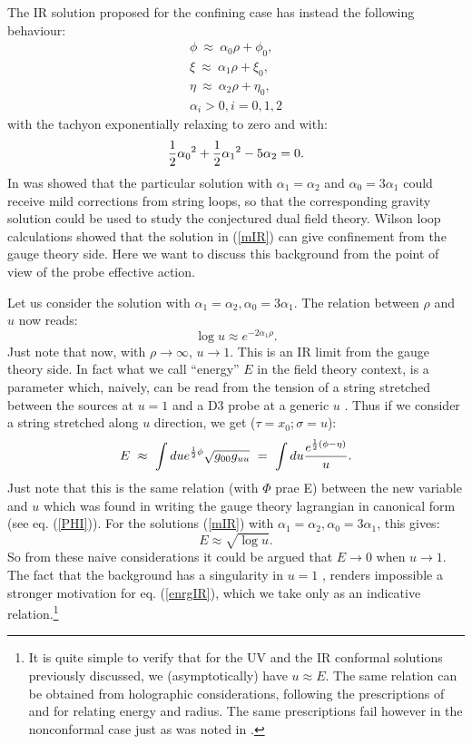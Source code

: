 \documentclass[a4paper,12pt]{article}
\def\half{{1 \over 2}}
\begin{document}
The IR solution proposed for the confining case \cite{minahan} has instead the following behaviour:
\begin{eqnarray}
\phi~\approx~ \alpha_0\rho + \phi_0 ,\nonumber\\
\xi~\approx~ \alpha_1\rho + \xi_0 ,\nonumber \\
\eta~\approx~ \alpha_2\rho +\eta_0,\nonumber \\
\alpha_i>0, i=0,1,2
\label{mIR}
\end{eqnarray}
with the tachyon exponentially relaxing to zero and with:
\begin{equation}
\half{\alpha_0}^2 + \half{\alpha_1}^2 -5{\alpha_2} = 0.
\end{equation}
In \cite{minahan} was showed that the particular solution with $\alpha_1=\alpha_2$ 
and $\alpha_0 = 3\alpha_1$ could receive mild corrections from
string loops, so that the corresponding gravity solution could be used to study the
conjectured dual field theory. Wilson loop calculations showed that the solution in 
(\ref{mIR}) can give confinement from the gauge theory side. Here we want to discuss
this background from the point of view of the probe effective action.

Let us consider the solution with $\alpha_1=\alpha_2 , \alpha_0 =3\alpha_1$. The 
relation between  $\rho$ and $u$ now reads:
\begin{equation}
{\log u}\approx e^{-2\alpha_1\rho}.
\end{equation}
Just note that now, with $\rho\rightarrow\infty$, $u\rightarrow 1$. This is 
 an IR limit from the gauge theory side. In fact what we call ``energy'' 
 $E$ in the field theory context, is a parameter which, naively, can be read from the 
tension of a string stretched between the sources at $u=1$ and a D3 probe at a 
generic $u$ \cite{malda0}. Thus if we consider a string stretched along $u$ direction,
we get ($\tau = x_0 ; \sigma = u$):
\begin{equation}
E~\approx~\int du e^{\half\phi}\sqrt{g_{00}g_{uu}}~=~\int du {e^{\half (\phi - \eta)}\over u}.
\end{equation}
Just note that this is the same relation (with $\Phi$ prae E) between the new variable and $u$ which was found in writing the gauge theory lagrangian in canonical form (see eq. (\ref{PHI})).
For the solutions (\ref{mIR}) with $\alpha_1=\alpha_2 , \alpha_0 =3\alpha_1$, this gives:
\begin{equation}
E\approx \sqrt{\log u}.
\label{enrgIR}
\end{equation}
So from these naive considerations it  could be  argued that $E\rightarrow 0$ 
when $u\rightarrow 1$. The fact that the background has a singularity in $u=1$ 
\cite{minahan}, renders impossible a stronger motivation for eq. (\ref{enrgIR}), 
which we take only as an indicative relation.\footnote{It is quite simple to verify that for the UV and  the IR conformal solutions 
previously discussed, we (asymptotically) have  $u\approx E$. The same relation can
be obtained from holographic considerations, following the prescriptions of \cite{sw} and
\cite{pepo} for relating energy and radius. The same prescriptions fail however in the nonconformal case just as was noted in \cite{pepo}.} 
\end{document}
